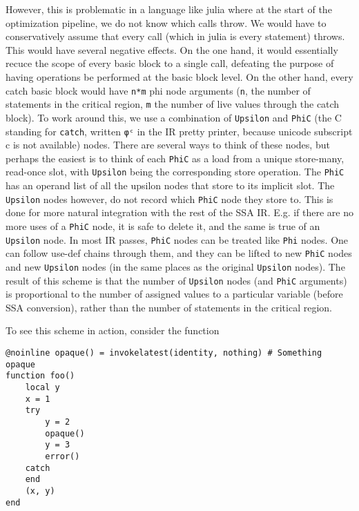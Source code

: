However, this is problematic in a language like julia where at the start of the optimization pipeline, we do not know which calls throw. We would have to conservatively assume that every call (which in julia is every statement) throws. This would have several negative effects. On the one hand, it would essentially recuce the scope of every basic block to a single call, defeating the purpose of having operations be performed at the basic block level. On the other hand, every catch basic block would have \texttt{n*m} phi node arguments (\texttt{n}, the number of statements in the critical region, \texttt{m} the number of live values through the catch block). To work around this, we use a combination of \texttt{Upsilon} and \texttt{PhiC} (the C standing for \texttt{catch}, written \texttt{φᶜ} in the IR pretty printer, because unicode subscript c is not available) nodes. There are several ways to think of these nodes, but perhaps the easiest is to think of each \texttt{PhiC} as a load from a unique store-many, read-once slot, with \texttt{Upsilon} being the corresponding store operation. The \texttt{PhiC} has an operand list of all the upsilon nodes that store to its implicit slot. The \texttt{Upsilon} nodes however, do not record which \texttt{PhiC} node they store to. This is done for more natural integration with the rest of the SSA IR. E.g. if there are no more uses of a \texttt{PhiC} node, it is safe to delete it, and the same is true of an \texttt{Upsilon} node. In most IR passes, \texttt{PhiC} nodes can be treated like \texttt{Phi} nodes. One can follow use-def chains through them, and they can be lifted to new \texttt{PhiC} nodes and new \texttt{Upsilon} nodes (in the same places as the original \texttt{Upsilon} nodes). The result of this scheme is that the number of \texttt{Upsilon} nodes (and \texttt{PhiC} arguments) is proportional to the number of assigned values to a particular variable (before SSA conversion), rather than the number of statements in the critical region.



To see this scheme in action, consider the function




\begin{verbatim}
@noinline opaque() = invokelatest(identity, nothing) # Something opaque
function foo()
    local y
    x = 1
    try
        y = 2
        opaque()
        y = 3
        error()
    catch
    end
    (x, y)
end
\end{verbatim}



